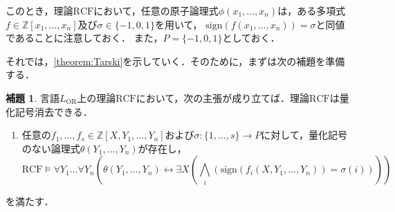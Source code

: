 \documentclass[uplatex, dvipdfmx]{jsarticle}
\newcommand{\Z}{\mathbb{Z}}
\newcommand{\RCF}{\mathrm{RCF}}
\newcommand{\sign}{\mathrm{sign}}
\newcommand{\map}[3]{{#1}:{#2}\rightarrow{#3}}
\theoremstyle{definition}
\newtheorem{lemma}{補題}[section]
\begin{document}
このとき，理論$\RCF$において，任意の原子論理式$\phi(x_1, \dots, x_n)$は，ある多項式$f \in \Z[x_1, \dots, x_n]$及び$\sigma \in \{-1, 0, 1\}$を用いて，
$\sign(f(x_1, \dots, x_n)) = \sigma$と同値であることに注意しておく．
また，$P = \{-1, 0, 1\}$としておく．

それでは，\cref{theorem:Tarski}を示していく．そのために，まずは次の補題を準備する．

\begin{lemma}\label{lemma:qe_simplify}
     言語$L_\mathrm{OR}$上の理論$\RCF$において，次の主張が成り立てば．理論$\RCF$は量化記号消去できる．

     \begin{enumerate}
          \item \label{qe_1}
          任意の$f_1, \dots, f_s \in \Z[X, Y_1, \dots, Y_n]$および$\map{\sigma}{\{1,\dots, s\}}{P}$に対して，量化記号のない論理式$\theta(Y_1, \dots, Y_n)$が存在し，
          \[
               \RCF \models \forall Y_1 \dots \forall Y_n ( \theta(Y_1, \dots, Y_n) \leftrightarrow \exists X(\bigwedge_i (\sign(f_i(X,Y_1, \dots, Y_n))= \sigma(i))) )
          \]
     \end{enumerate}
     を満たす．
\end{lemma}
\end{document}
